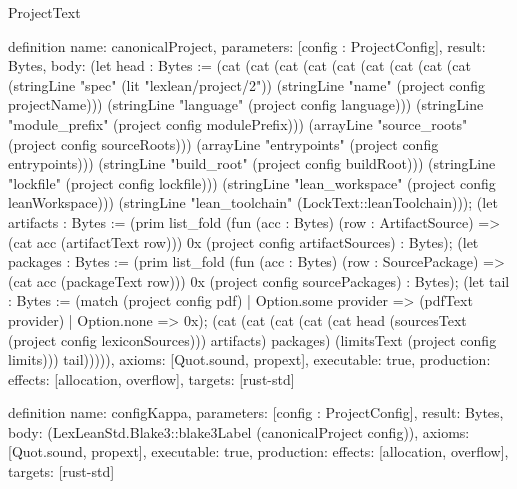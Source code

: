 \begin{lexlean}{ProjectText}
\begin{semanticmodule}
definition{
  name: canonicalProject,
  parameters: [config : ProjectConfig],
  result: Bytes,
  body: (let head : Bytes := (cat (cat (cat (cat (cat (cat (cat (cat (cat (stringLine "spec" (lit "lexlean/project/2")) (stringLine "name" (project config projectName))) (stringLine "language" (project config language))) (stringLine "module_prefix" (project config modulePrefix))) (arrayLine "source_roots" (project config sourceRoots))) (arrayLine "entrypoints" (project config entrypoints))) (stringLine "build_root" (project config buildRoot))) (stringLine "lockfile" (project config lockfile))) (stringLine "lean_workspace" (project config leanWorkspace))) (stringLine "lean_toolchain" (LockText::leanToolchain))); (let artifacts : Bytes := (prim list_fold (fun (acc : Bytes) (row : ArtifactSource) => (cat acc (artifactText row))) 0x (project config artifactSources) : Bytes); (let packages : Bytes := (prim list_fold (fun (acc : Bytes) (row : SourcePackage) => (cat acc (packageText row))) 0x (project config sourcePackages) : Bytes); (let tail : Bytes := (match (project config pdf)
    | Option.some provider => (pdfText provider)
    | Option.none => 0x); (cat (cat (cat (cat (cat head (sourcesText (project config lexiconSources))) artifacts) packages) (limitsText (project config limits))) tail))))),
  axioms: [Quot.sound, propext],
  executable: true,
  production: {effects: [allocation, overflow], targets: [rust-std]}
}

definition{
  name: configKappa,
  parameters: [config : ProjectConfig],
  result: Bytes,
  body: (LexLeanStd.Blake3::blake3Label (canonicalProject config)),
  axioms: [Quot.sound, propext],
  executable: true,
  production: {effects: [allocation, overflow], targets: [rust-std]}
}
\end{semanticmodule}
\end{lexlean}
